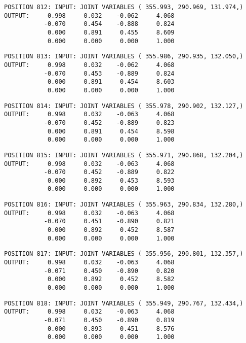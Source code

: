 \begin{verbatim}
POSITION 812: INPUT: JOINT VARIABLES ( 355.993, 290.969, 131.974,)
OUTPUT:     0.998     0.032    -0.062     4.068
           -0.070     0.454    -0.888     0.824
            0.000     0.891     0.455     8.609
            0.000     0.000     0.000     1.000
\end{verbatim} \pagebreak[1]\begin{verbatim}
POSITION 813: INPUT: JOINT VARIABLES ( 355.986, 290.935, 132.050,)
OUTPUT:     0.998     0.032    -0.062     4.068
           -0.070     0.453    -0.889     0.824
            0.000     0.891     0.454     8.603
            0.000     0.000     0.000     1.000
\end{verbatim} \pagebreak[1]\begin{verbatim}
POSITION 814: INPUT: JOINT VARIABLES ( 355.978, 290.902, 132.127,)
OUTPUT:     0.998     0.032    -0.063     4.068
           -0.070     0.452    -0.889     0.823
            0.000     0.891     0.454     8.598
            0.000     0.000     0.000     1.000
\end{verbatim} \pagebreak[1]\begin{verbatim}
POSITION 815: INPUT: JOINT VARIABLES ( 355.971, 290.868, 132.204,)
OUTPUT:     0.998     0.032    -0.063     4.068
           -0.070     0.452    -0.889     0.822
            0.000     0.892     0.453     8.593
            0.000     0.000     0.000     1.000
\end{verbatim} \pagebreak[1]\begin{verbatim}
POSITION 816: INPUT: JOINT VARIABLES ( 355.963, 290.834, 132.280,)
OUTPUT:     0.998     0.032    -0.063     4.068
           -0.070     0.451    -0.890     0.821
            0.000     0.892     0.452     8.587
            0.000     0.000     0.000     1.000
\end{verbatim} \pagebreak[1]\begin{verbatim}
POSITION 817: INPUT: JOINT VARIABLES ( 355.956, 290.801, 132.357,)
OUTPUT:     0.998     0.032    -0.063     4.068
           -0.071     0.450    -0.890     0.820
            0.000     0.892     0.452     8.582
            0.000     0.000     0.000     1.000
\end{verbatim} \pagebreak[1]\begin{verbatim}
POSITION 818: INPUT: JOINT VARIABLES ( 355.949, 290.767, 132.434,)
OUTPUT:     0.998     0.032    -0.063     4.068
           -0.071     0.450    -0.890     0.819
            0.000     0.893     0.451     8.576
            0.000     0.000     0.000     1.000
\end{verbatim} \pagebreak[1]\begin{verbatim}

\end{verbatim}
